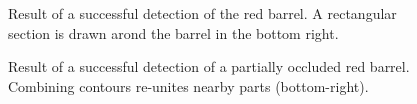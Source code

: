 \documentclass[letterpaper, 10 pt, conference]{ieeeconf}  %
\begin{document}
   \begin{figure}[thpb]
      \centering
      
      \caption{Result of a successful detection of the red barrel. A rectangular section is drawn arond the barrel in the bottom right.}
      \label{resultfig}
   \end{figure}


   \begin{figure}[thpb]
      \centering
      
      \caption{Result of a successful detection of a partially occluded red barrel. Combining contours re-unites nearby parts (bottom-right).}
      \label{resultfig-occluded}
   \end{figure}
   
\end{document}
